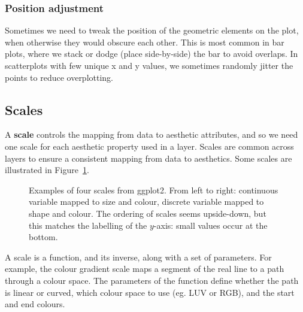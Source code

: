 \subsubsection{Position adjustment}

Sometimes we need to tweak the position of the geometric elements on the plot, when otherwise they would obscure each other.  This is most common in bar plots, where we stack or dodge (place side-by-side) the bar to avoid overlaps.  In scatterplots with few unique x and y values, we sometimes randomly jitter \citep{chambers:1983} the points to reduce overplotting.  

\subsection{Scales}\label{sec:scales}

A {\bf scale} controls the mapping from data to aesthetic attributes, and so we need one scale for each aesthetic property used in a layer.  Scales are common across layers to ensure a consistent mapping from data to aesthetics.  Some scales are illustrated in Figure~\ref{fig:scales}.

\begin{figure}[htbp]
	\centering
	\caption{Examples of four scales from ggplot2.  From left to right: continuous variable mapped to size and colour, discrete variable mapped to shape and colour.  The ordering of scales seems upside-down, but this matches the labelling of the $y$-axis: small values occur at the bottom.}
	\label{fig:scales}
\end{figure}



A scale is a function, and its inverse, along with a set of parameters.  For example, the colour gradient scale maps a segment of the real line to a path through a colour space.  The parameters of the function define whether the path is linear or curved, which colour space to use (eg. LUV or RGB), and the start and end colours.  

